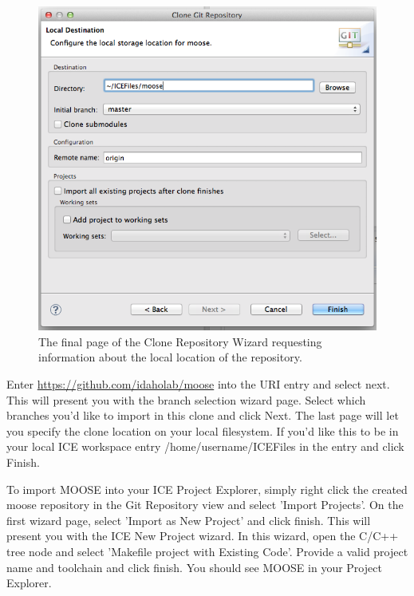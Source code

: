 \begin{figure}[htbp]
\centering
\includegraphics[width=\textwidth]{figures/Clone_wizard3.png}
\caption{The final page of the Clone Repository Wizard requesting information about the local location of the repository.}
\end{figure}

Enter \url{https://github.com/idaholab/moose} into the URI entry and
select next. This will present you with the branch selection wizard
page. Select which branches you'd like to import in this clone and click
Next. The last page will let you specify the clone location on your
local filesystem. If you'd like this to be in your local ICE workspace
entry /home/username/ICEFiles in the entry and click Finish.

To import MOOSE into your ICE Project Explorer, simply right click the
created moose repository in the Git Repository view and select 'Import
Projects'. On the first wizard page, select 'Import as New Project' and
click finish. This will present you with the ICE New Project wizard. In
this wizard, open the C/C++ tree node and select 'Makefile project with
Existing Code'. Provide a valid project name and toolchain and click
finish. You should see MOOSE in your Project Explorer.

